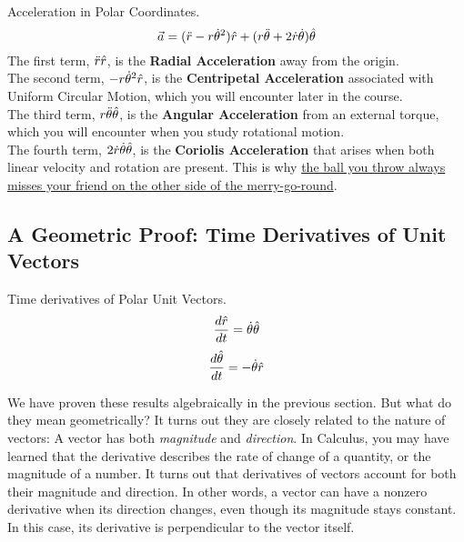 \documentclass[11pt]{article}
\theoremstyle{gangnamstyle}{\newtheorem{definition}{Definition}[]}
\theoremstyle{gangnamstyle}{\newtheorem{example}{Example}[]}
\theoremstyle{gangnamstyle}{\newtheorem{problem}{Problem}[]}
\begin{document}
\begin{definition}
Acceleration in Polar Coordinates. \\
\begin{equation}
\Vec{a} = (\Ddot{r} - r\Dot{\theta}^2)\Hat{r} + (r\Ddot{\theta} + 2\Dot{r}\Dot{\theta})\Hat{\theta}
\end{equation}
The first term, $\Ddot{r}\Hat{r}$, is the \textbf{Radial Acceleration} away from the origin. \\ 
The second term, $-r\Dot{\theta}^2\Hat{r}$, is the \textbf{Centripetal Acceleration} associated with Uniform Circular Motion, which you will encounter later in the course. \\
The third term, $r\Ddot{\theta}\Hat{\theta}$, is the \textbf{Angular Acceleration} from an external torque, which you will encounter when you study rotational motion. \\
The fourth term, $2\Dot{r}\Dot{\theta}\Hat{\theta}$, is the \textbf{Coriolis Acceleration} that arises when both linear velocity and rotation are present. This is why \href{https://www.youtube.com/watch?v=7TjOy56-x8Q}{the ball you throw always misses your friend on the other side of the merry-go-round}. 
\end{definition}

\subsection{A Geometric Proof: Time Derivatives of Unit Vectors}

\begin{definition}
Time derivatives of Polar Unit Vectors. 
\begin{equation}
    \frac{d\Hat{r}}{dt} = \Dot{\theta}\Hat{\theta}
\end{equation}
\begin{equation}
    \frac{d\Hat{\theta}}{dt} = -\Dot{\theta}\Hat{r}
\end{equation}
\end{definition}
We have proven these results algebraically in the previous section. But what do they mean geometrically? It turns out they are closely related to the nature of vectors: A vector has both \textit{magnitude} and \textit{direction}. In Calculus, you may have learned that the derivative describes the rate of change of a quantity, or the magnitude of a number. It turns out that derivatives of vectors account for both their magnitude and direction. In other words, a vector can have a nonzero derivative when its direction changes, even though its magnitude stays constant. In this case, its derivative is perpendicular to the vector itself. 
\end{document}
